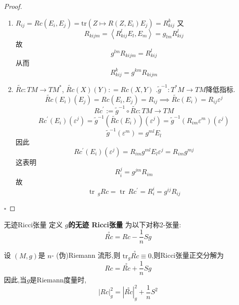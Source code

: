 \documentclass[../../几何与拓扑.tex]{subfiles}
\begin{document}
\begin{proof}
   
    \begin{enumerate}
        \item \(  R_{ij}= Rc\left( E_{i},E_{j} \right)   = \mathrm{tr}\left( Z\mapsto R\left( Z,E_{i} \right)E_{j}  \right) = R_{kij}^{k}\) 
        又 \[
        R_{kijm}= \left<R_{kij}^{l}E_{l},E_{m} \right>= g_{lm}R_{kij}^{l}
        \]故 \[
        g^{lm}R_{kijm}= R_{kij}^{l}
        \]从而 \[
        R_{kij}^{k}= g^{km}R_{kijm}
        \]
      
        \item  \(  \tilde{Rc}: TM\to TM^{*}  \), \(  \tilde{Rc}\left( X \right)\left( Y \right): =  Rc\left( X,Y \right)     \) 
        .\(  \tilde{g}^{-1} : T^{*}M\to TM  \)降低指标. \[
        \tilde{Rc}\left( E_{i} \right)\left( E_{j} \right)= Rc\left( E_{i},E_{j} \right)= R_{ij}   \implies \tilde{Rc}\left( E_{i} \right)= R_{ij} \varepsilon ^{j} 
        \]   \[
       Rc^{\prime} :=  \tilde{g}^{-1} \circ \tilde{Rc}:TM\to TM
        \]  \[
        Rc^{\prime} \left( E_{i} \right)\left(  \varepsilon ^{j} \right)= \tilde{g}^{-1} \left( \tilde{Rc}\left( E_{i} \right)  \right)\left(  \varepsilon ^{j} \right)    = \tilde{g}^{-1} \left( R_{im} \varepsilon ^{m} \right)\left(  \varepsilon ^{j} \right)  
        \] \[
        \tilde{g}^{-1} \left(  \varepsilon ^{m} \right)= g^{ml}E_{l} 
        \]因此 \[
        Rc^{\prime} \left( E_{i} \right)\left(  \varepsilon ^{j} \right)= R_{im}g^{ml}E_{l} \varepsilon ^{j}= R_{im}g^{mj}  
        \]这表明 \[
        R_{i}^{j}= g^{jm}R_{im}
        \]故 \[
        \operatorname{tr}\,_{g}Rc= \operatorname{tr}\,Rc^{\prime} = R_{i}^{i}= g^{ij}R_{ij}
        \] 
    \end{enumerate}
    
    \hfill $\square$
\end{proof}

\begin{definition}{无迹Ricci张量}
    定义 \textbf{\(  g  \)的无迹 Ricci张量 }为以下对称2-张量: \[
    \overset{\scriptstyle\circ}{Rc} =  Rc -\frac{1 }{n }Sg 
    \]  
\end{definition}

\begin{proposition}
    设 \(  \left( M,g \right)   \)是 \(  n  \)- (伪)Riemann 流形,则 \(  \mathrm{tr}_{g}\overset{\scriptstyle\circ}{Rc}\equiv 0  \),则Ricci张量正交分解为 \[
  Rc =  \overset{\scriptstyle\circ}{Rc} +  \frac{1 }{n }Sg 
    \]因此,当\(  g  \)是Riemann度量时, \[
    \left| Rc \right|_{g}^{2} =  \left| \overset{\scriptstyle\circ}{Rc}  \right|_{g}^{2}+  \frac{1 }{n }S^{2} 
    \] 
\end{proposition}
\end{document}
